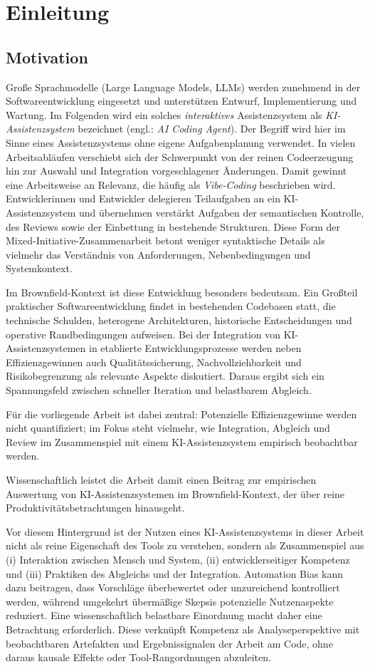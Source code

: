 \chapter{Einleitung}
\label{chap:introduction}

\section{Motivation}
Große Sprachmodelle (Large Language Models, LLMs) werden zunehmend in der Softwareentwicklung eingesetzt und unterstützen Entwurf, Implementierung und Wartung.
Im Folgenden wird ein solches \emph{interaktives} Assistenzsystem als \emph{KI-Assistenzsystem} bezeichnet (engl.: \emph{AI Coding Agent}). Der Begriff wird hier im Sinne eines Assistenzsystems ohne eigene Aufgabenplanung verwendet.
In vielen Arbeitsabläufen verschiebt sich der Schwerpunkt von der reinen Codeerzeugung hin zur Auswahl und Integration vorgeschlagener Änderungen.
Damit gewinnt eine Arbeitsweise an Relevanz, die häufig als \emph{Vibe-Coding} beschrieben wird.
Entwicklerinnen und Entwickler delegieren Teilaufgaben an ein KI-Assistenzsystem und übernehmen verstärkt Aufgaben der semantischen Kontrolle, des Reviews sowie der Einbettung in bestehende Strukturen.
Diese Form der Mixed-Initiative-Zusammenarbeit betont weniger syntaktische Details als vielmehr das Verständnis von Anforderungen, Nebenbedingungen und Systemkontext.

Im Brownfield-Kontext ist diese Entwicklung besonders bedeutsam.
Ein Großteil praktischer Softwareentwicklung findet in bestehenden Codebasen statt, die technische Schulden, heterogene Architekturen, historische Entscheidungen und operative Randbedingungen aufweisen.
Bei der Integration von KI-Assistenzsystemen in etablierte Entwicklungsprozesse werden neben Effizienzgewinnen auch Qualitätssicherung, Nachvollziehbarkeit und Risikobegrenzung als relevante Aspekte diskutiert.
Daraus ergibt sich ein Spannungsfeld zwischen schneller Iteration und belastbarem Abgleich.

Für die vorliegende Arbeit ist dabei zentral: Potenzielle Effizienzgewinne werden nicht quantifiziert; im Fokus steht vielmehr, wie Integration, Abgleich und Review im Zusammenspiel mit einem KI-Assistenzsystem empirisch beobachtbar werden.

Wissenschaftlich leistet die Arbeit damit einen Beitrag zur empirischen Auswertung von KI-Assistenzsystemen im Brownfield-Kontext, der über reine Produktivitätsbetrachtungen hinausgeht.

Vor diesem Hintergrund ist der Nutzen eines KI-Assistenzsystems in dieser Arbeit nicht als reine Eigenschaft des Tools zu verstehen, sondern als Zusammenspiel aus (i) Interaktion zwischen Mensch und System, (ii) entwicklerseitiger Kompetenz und (iii) Praktiken des Abgleichs und der Integration.
Automation Bias kann dazu beitragen, dass Vorschläge überbewertet oder unzureichend kontrolliert werden, während umgekehrt übermäßige Skepsis potenzielle Nutzenaspekte reduziert.
Eine wissenschaftlich belastbare Einordnung macht daher eine Betrachtung erforderlich.
Diese verknüpft Kompetenz als Analyseperspektive mit beobachtbaren Artefakten und Ergebnissignalen der Arbeit am Code, ohne daraus kausale Effekte oder Tool-Rangordnungen abzuleiten.

